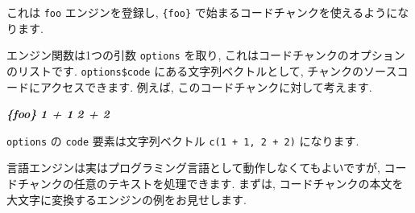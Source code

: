 \documentclass[
  11pt,
  lualatex,
  ja=standard]{bxjsreport}
\newenvironment{Shaded}{\begin{snugshade}}{\end{snugshade}}
\newcommand{\AttributeTok}[1]{\textcolor[rgb]{0.77,0.63,0.00}{#1}}
\newcommand{\CommentTok}[1]{\textcolor[rgb]{0.56,0.35,0.01}{\textit{#1}}}
\newcommand{\ControlFlowTok}[1]{\textcolor[rgb]{0.13,0.29,0.53}{\textbf{#1}}}
\newcommand{\FunctionTok}[1]{\textcolor[rgb]{0.00,0.00,0.00}{#1}}
\newcommand{\InformationTok}[1]{\textcolor[rgb]{0.56,0.35,0.01}{\textbf{\textit{#1}}}}
\newcommand{\NormalTok}[1]{#1}
\newcommand{\OtherTok}[1]{\textcolor[rgb]{0.56,0.35,0.01}{#1}}
\newcommand{\SpecialCharTok}[1]{\textcolor[rgb]{0.00,0.00,0.00}{#1}}
\newcommand{\StringTok}[1]{\textcolor[rgb]{0.31,0.60,0.02}{#1}}
\begin{document}
\begin{Shaded}
\end{Shaded}

これは \texttt{foo} エンジンを登録し, \texttt{\textasciigrave{}\textasciigrave{}\textasciigrave{}\{foo\}} で始まるコードチャンクを使えるようになります.

エンジン関数は1つの引数 \texttt{options} を取り, これはコードチャンクのオプションのリストです. \texttt{options\$code} にある文字列ベクトルとして, チャンクのソースコードにアクセスできます. 例えば, このコードチャンクに対して考えます.

\begin{Shaded}
\begin{Highlighting}[]
\InformationTok{\textasciigrave{}\textasciigrave{}\textasciigrave{}\{foo\}}
\InformationTok{1 + 1}
\InformationTok{2 + 2}
\InformationTok{\textasciigrave{}\textasciigrave{}\textasciigrave{}}
\end{Highlighting}
\end{Shaded}

\texttt{options} の \texttt{code} 要素は文字列ベクトル \texttt{c(\textquotesingle{}1\ +\ 1\textquotesingle{},\ \textquotesingle{}2\ +\ 2\textquotesingle{})} になります.

言語エンジンは実はプログラミング言語として動作しなくてもよいですが, コードチャンクの任意のテキストを処理できます. まずは, コードチャンクの本文を大文字に変換するエンジンの例をお見せします.

\begin{Shaded}
\end{Shaded}
\end{document}
